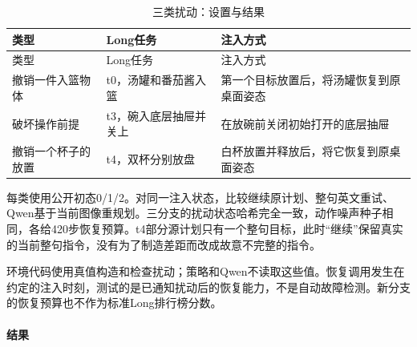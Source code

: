 \FloatBarrier\begingroup\small\setlength{\tabcolsep}{2.5pt}
\begin{longtable}[]{@{}
  >{\raggedright\arraybackslash}p{}
  >{\raggedright\arraybackslash}p{}
  >{\raggedright\arraybackslash}p{}@{}}
\caption{三类扰动：设置与结果}\label{tab:s10-5}\tabularnewline
\toprule\noalign{}
\begin{minipage}[b]{\linewidth}\raggedright
类型
\end{minipage} & \begin{minipage}[b]{\linewidth}\raggedright
Long任务
\end{minipage} & \begin{minipage}[b]{\linewidth}\raggedright
注入方式
\end{minipage} \\
\midrule\noalign{}
\endfirsthead
\toprule\noalign{}
\begin{minipage}[b]{\linewidth}\raggedright
类型
\end{minipage} & \begin{minipage}[b]{\linewidth}\raggedright
Long任务
\end{minipage} & \begin{minipage}[b]{\linewidth}\raggedright
注入方式
\end{minipage} \\
\midrule\noalign{}
\endhead
\bottomrule\noalign{}
\endlastfoot
撤销一件入篮物体 & t0，汤罐和番茄酱入篮 & 第一个目标放置后，将汤罐恢复到原桌面姿态 \\
破坏操作前提 & t3，碗入底层抽屉并关上 & 在放碗前关闭初始打开的底层抽屉 \\
撤销一个杯子的放置 & t4，双杯分别放盘 & 白杯放置并释放后，将它恢复到原桌面姿态 \\
\end{longtable}\endgroup

每类使用公开初态0/1/2。对同一注入状态，比较继续原计划、整句英文重试、Qwen基于当前图像重规划。三分支的扰动状态哈希完全一致，动作噪声种子相同，各给420步恢复预算。t4部分源计划只有一个整句目标，此时``继续''保留真实的当前整句指令，没有为了制造差距而改成故意不完整的指令。

环境代码使用真值构造和检查扰动；策略和Qwen不读取这些值。恢复调用发生在约定的注入时刻，测试的是已通知扰动后的恢复能力，不是自动故障检测。新分支的恢复预算也不作为标准Long排行榜分数。

\paragraph{结果}\label{s10-detail-18}

